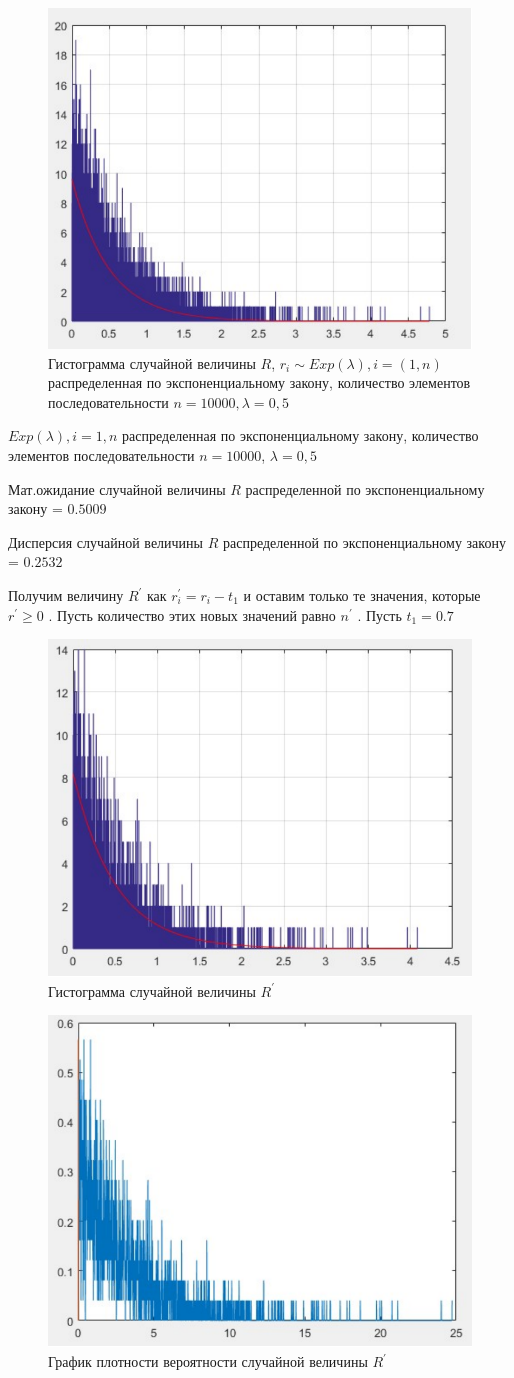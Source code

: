 \begin{figure}[h]
	\centering\includegraphics[width=0.4\linewidth]{img/kich_bur/image1}
	\caption{Гистограмма случайной величины $ R $, $r_i \sim Exp(\lambda),i=(1,n) $ распределенная по экспоненциальному закону, количество элементов последовательности $ n=10000, \lambda=0,5 $}
	\label{fig:img1}
\end{figure}

$Exp(\lambda),i=1,n$
распределенная по экспоненциальному закону, количество элементов последовательности
$n=10000$, $\lambda=0,5$ 


Мат.ожидание случайной величины $ R $ распределенной по экспоненциальному
закону = $ 0.5009  $

Дисперсия случайной величины $ R $ распределенной по экспоненциальному
закону = $ 0.2532 $ 

Получим величину $R^{'}$ как $r_{i}^{'}=r_{i}-t_{1}$ и оставим
только те значения, которые $r^{'}\geq0$ . Пусть количество этих
новых значений равно $n^{'}$ . Пусть $t_{1}=0.7$

\begin{figure}[h]
	\centering
	\includegraphics[width=0.4\linewidth]{img/kich_bur/image2}
	\caption{Гистограмма случайной величины $ R^{'} $}
	\label{fig:img2}
\end{figure}

\begin{figure}[h]
	\centering
	\includegraphics[width=0.4\linewidth]{img/kich_bur/image3}
	\caption{График плотности вероятности случайной величины $ R^{'} $}
	\label{fig:img3}
\end{figure}

